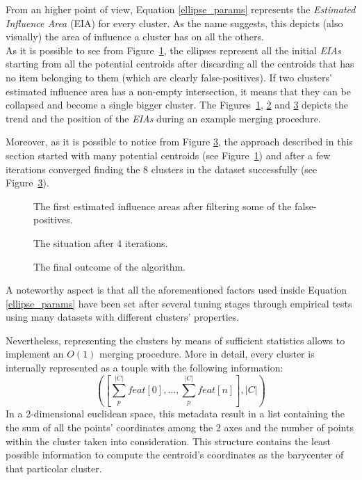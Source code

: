 From an higher point of view, Equation \ref{ellipse_params} represents the \emph{Estimated Influence Area}
(EIA) for every cluster. As the name suggests, this depicts (also visually) the area of influence a 
cluster has on all the others.\\
As it is possible to see from Figure~\ref{start}, the ellipses represent all the initial
\emph{EIAs} starting from all the potential centroids after discarding
all the centroids that has no item belonging to them (which are clearly false-positives).
If two clusters' estimated influence area has a non-empty intersection, it
means that they can be collapsed and become a single bigger cluster.
The Figures~\ref{start}, \ref{middle} and \ref{end} depicts the trend and the position of the
\emph{EIAs} during an example merging procedure.

Moreover, as it is possible to notice from Figure \ref{end}, the approach described in this
section started with many potential centroids (see Figure~\ref{start}) and after a
few iterations converged finding the 8 clusters in the dataset successfully 
(see Figure~\ref{end}). 

\begin{figure}[t]
  \caption{The first estimated influence areas after filtering some of the false-positives.}
  \label{start}
\end{figure}

\begin{figure}[t]
  \caption{The situation after 4 iterations.}
  \label{middle}
\end{figure}

\begin{figure}[t]
  \caption{The final outcome of the algorithm.}
  \label{end}
\end{figure}

A noteworthy aspect is that all the aforementioned factors used inside Equation \ref{ellipse_params} have
been set after several tuning stages through empirical tests using many datasets with different
clusters' properties.

Nevertheless, representing the clusters by means of sufficient statistics allows to implement an $O(1)$
merging procedure. More in detail, every cluster is internally represented as a touple with the
following information:
\begin{equation*}
    \left(\left[\sum_{p}^{|C|} feat[0],\dots,\sum_{p}^{|C|} feat[n]\right],|C|\right)
\end{equation*}
In a 2-dimensional euclidean space, this metadata result in a list containing the the sum of all the
points' coordinates among the 2 axes and the number of points within the cluster taken into consideration.
This structure contains the least possible information to compute the centroid's coordinates as the
barycenter of that particolar cluster.  

